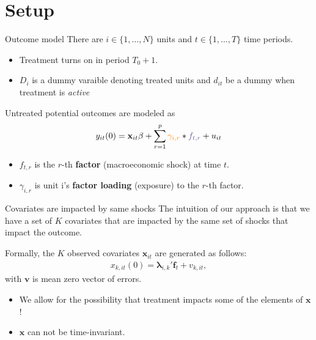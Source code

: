 \documentclass[aspectratio=169,t,11pt,table]{beamer}
\def\*#1{\mathbf{#1}}
\def\+#1{\boldsymbol{#1}}
\begin{document}
\section{Setup}

\begin{frame}{Outcome model}
  There are $i \in \{ 1, \dots, N \}$ units and $t \in \{ 1, \dots, T \}$ time periods. 
  \begin{itemize}
    \item Treatment turns on in period $T_0 + 1$.
    \item $D_i$ is a dummy varaible denoting treated units and $d_{it}$ be a dummy when treatment is \emph{active}
  \end{itemize}
  
  \bigskip
  Untreated potential outcomes are modeled as
  $$
    y_{it}(0) = \*x_{it}\beta + \sum_{r = 1}^{p} \orange{\gamma_{i,r}} * \purple{f_{t,r}} + u_{it}
  $$

  \begin{itemize}
    \item $f_{t, r}$ is the $r$-th \textbf{\color{purple} factor} (macroeconomic shock) at time $t$.
    \item $\gamma_{i,r}$ is unit i's \textbf{\color{orange} factor loading} (exposure) to the $r$-th factor.
  \end{itemize}
\end{frame}

\begin{frame}{Covariates are impacted by same shocks}
  The intuition of our approach is that we have a set of $K$ covariates that are impacted by the same set of shocks that impact the outcome.
  
  \medskip
  Formally, the $K$ observed covariates $\* x_{it}$ are generated as follows:
  \begin{align}
    x_{k,it}(0) = \+\lambda_{i,k}'\*f_t + v_{k,it},
  \end{align}
  with $\*v$ is mean zero vector of errors.

  \begin{itemize}
    \item We allow for the possibility that treatment impacts some of the elements of $\*x$!

    \item $\*x$ can not be time-invariant.
  \end{itemize}
\end{frame}
\end{document}
